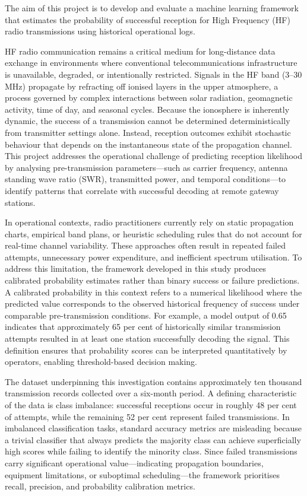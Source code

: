 The aim of this project is to develop and evaluate a machine learning
framework that estimates the probability of successful reception for
High Frequency (HF) radio transmissions using historical operational
logs.

HF radio communication remains a critical medium for long-distance data
exchange in environments where conventional telecommunications
infrastructure is unavailable, degraded, or intentionally restricted.
Signals in the HF band (3--30 MHz) propagate by refracting off ionised
layers in the upper atmosphere, a process governed by complex
interactions between solar radiation, geomagnetic activity, time of day,
and seasonal cycles. Because the ionosphere is inherently dynamic, the
success of a transmission cannot be determined deterministically from
transmitter settings alone. Instead, reception outcomes exhibit
stochastic behaviour that depends on the instantaneous state of the
propagation channel. This project addresses the operational challenge of
predicting reception likelihood by analysing pre-transmission
parameters---such as carrier frequency, antenna standing wave ratio
(SWR), transmitted power, and temporal conditions---to identify patterns
that correlate with successful decoding at remote gateway stations.

In operational contexts, radio practitioners currently rely on static
propagation charts, empirical band plans, or heuristic scheduling rules
that do not account for real-time channel variability. These approaches
often result in repeated failed attempts, unnecessary power expenditure,
and inefficient spectrum utilisation. To address this limitation, the
framework developed in this study produces calibrated probability
estimates rather than binary success or failure predictions. A
calibrated probability in this context refers to a numerical likelihood
where the predicted value corresponds to the observed historical
frequency of success under comparable pre-transmission conditions. For
example, a model output of 0.65 indicates that approximately 65 per cent
of historically similar transmission attempts resulted in at least one
station successfully decoding the signal. This definition ensures that
probability scores can be interpreted quantitatively by operators,
enabling threshold-based decision making.

The dataset underpinning this investigation contains approximately ten
thousand transmission records collected over a six-month period. A
defining characteristic of the data is class imbalance: successful
receptions occur in roughly 48 per cent of attempts, while the remaining
52 per cent represent failed transmissions. In imbalanced classification
tasks, standard accuracy metrics are misleading because a trivial
classifier that always predicts the majority class can achieve
superficially high scores while failing to identify the minority class.
Since failed transmissions carry significant operational
value---indicating propagation boundaries, equipment limitations, or
suboptimal scheduling---the framework prioritises recall, precision, and
probability calibration metrics.

